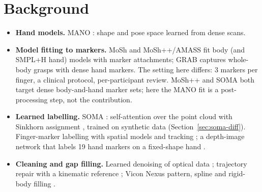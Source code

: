 \documentclass[11pt,a4paper]{article}
\begin{document}
\section{Background}
\begin{itemize}[nosep]
  \item \textbf{Hand models.} MANO \citep{romero2017mano}: shape and pose space learned from dense scans.
  \item \textbf{Model fitting to markers.} MoSh \citep{loper2014mosh} and MoSh++/AMASS \citep{mahmood2019amass} fit body
  (and SMPL+H hand) models with marker attachments; GRAB \citep{taheri2020grab} captures whole-body grasps with dense
  hand markers. The setting here differs: 3 markers per finger, a clinical protocol, per-participant review. MoSh++
  and SOMA both target dense body-and-hand marker sets; here the MANO fit is a post-processing step, not the contribution.
  \item \textbf{Learned labelling.} SOMA \citep{ghorbani2021soma}: self-attention over the point cloud with Sinkhorn
  assignment \citep{sarlin2020superglue}, trained on synthetic data (Section~\ref{sec:soma-diff}). Finger-marker
  labelling with spatial models and tracking \citep{alexanderson2017labeling}; a depth-image network that labels 19
  hand markers on a fixed-shape hand \citep{han2018online}.
  \item \textbf{Cleaning and gap filling.} Learned denoising of optical data \citep{holden2018robust}; trajectory
  repair with a kinematic reference \citep{perepichka2019robust}; Vicon Nexus pattern, spline and rigid-body filling
  \citep{vicon_nexus}.
\end{itemize}

\end{document}
